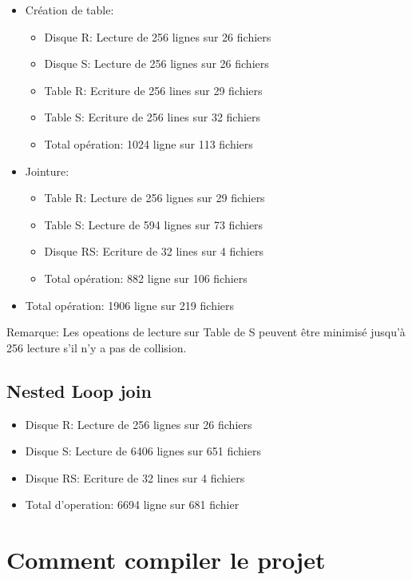 \documentclass[a4paper]{article}
\begin{document}
\begin{itemize}
  \item Création de table:
  \begin{itemize}
    \item Disque R: Lecture de 256 lignes sur 26 fichiers
    \item Disque S: Lecture de 256 lignes sur 26 fichiers
    \item Table R: Ecriture de 256 lines sur 29 fichiers
    \item Table S: Ecriture de 256 lines sur 32 fichiers
    \item Total opération: 1024 ligne sur 113 fichiers
  \end{itemize}
  \item Jointure:
  \begin{itemize}
      \item Table R: Lecture de 256 lignes sur 29 fichiers
      \item Table S: Lecture de 594 lignes sur 73 fichiers
      \item Disque RS: Ecriture de 32 lines sur 4 fichiers
      \item Total opération: 882 ligne sur 106 fichiers
  \end{itemize}
  \item Total opération: 1906 ligne sur 219 fichiers
\end{itemize}

Remarque: Les opeations de lecture sur Table de S peuvent être minimisé
jusqu'à 256 lecture s'il n'y a pas de collision.

\subsection{Nested Loop join}

\begin{itemize}
  \item Disque R: Lecture de 256 lignes sur 26 fichiers
  \item Disque S: Lecture de 6406 lignes sur 651 fichiers
  \item Disque RS: Ecriture de 32 lines sur 4 fichiers
  \item Total d'operation: 6694 ligne sur 681 fichier
\end{itemize}

\section{Comment compiler le projet}
\end{document}
